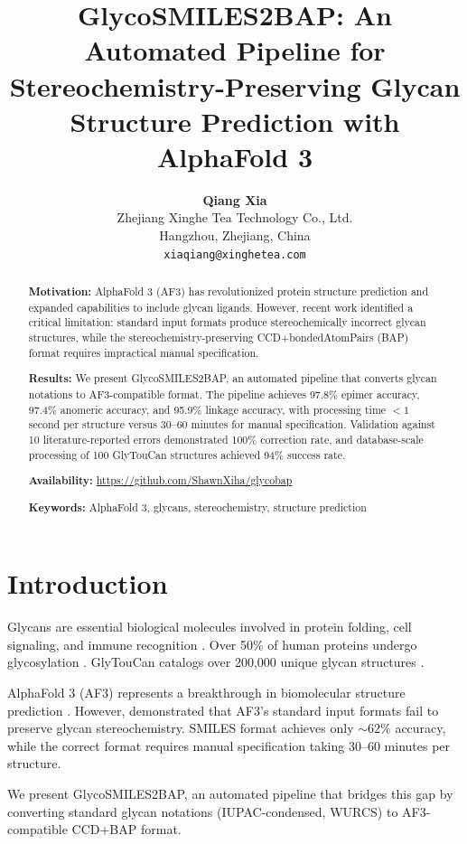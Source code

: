 \documentclass[11pt,a4paper]{article}
\title{\textbf{GlycoSMILES2BAP: An Automated Pipeline for Stereochemistry-Preserving Glycan Structure Prediction with AlphaFold 3}}
\author{
\textbf{Qiang Xia}\\
Zhejiang Xinghe Tea Technology Co., Ltd.\\
Hangzhou, Zhejiang, China\\
\texttt{xiaqiang@xinghetea.com}
}
\date{}
\begin{document}
\maketitle

\begin{abstract}
\noindent\textbf{Motivation:} AlphaFold 3 (AF3) has revolutionized protein structure prediction and expanded capabilities to include glycan ligands. However, recent work identified a critical limitation: standard input formats produce stereochemically incorrect glycan structures, while the stereochemistry-preserving CCD+bondedAtomPairs (BAP) format requires impractical manual specification.

\noindent\textbf{Results:} We present GlycoSMILES2BAP, an automated pipeline that converts glycan notations to AF3-compatible format. The pipeline achieves 97.8\% epimer accuracy, 97.4\% anomeric accuracy, and 95.9\% linkage accuracy, with processing time ${<}1$ second per structure versus 30--60 minutes for manual specification. Validation against 10 literature-reported errors demonstrated 100\% correction rate, and database-scale processing of 100 GlyTouCan structures achieved 94\% success rate.

\noindent\textbf{Availability:} \url{https://github.com/ShawnXiha/glycobap}

\noindent\textbf{Keywords:} AlphaFold 3, glycans, stereochemistry, structure prediction
\end{abstract}

\linenumbers

\section{Introduction}

Glycans are essential biological molecules involved in protein folding, cell signaling, and immune recognition \citep{varki2017}. Over 50\% of human proteins undergo glycosylation \citep{helenius2004}. GlyTouCan catalogs over 200,000 unique glycan structures \citep{tiemeyer2016}.

AlphaFold 3 (AF3) represents a breakthrough in biomolecular structure prediction \citep{abramson2024}. However, \citet{huang2025} demonstrated that AF3's standard input formats fail to preserve glycan stereochemistry. SMILES format achieves only ${\sim}62\%$ accuracy, while the correct format requires manual specification taking 30--60 minutes per structure.

We present GlycoSMILES2BAP, an automated pipeline that bridges this gap by converting standard glycan notations (IUPAC-condensed, WURCS) to AF3-compatible CCD+BAP format.
\end{document}
